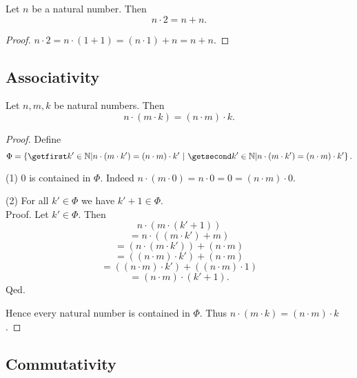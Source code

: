 \documentclass[../arithmetic.tex]{subfiles}
\begin{document}
  \begin{forthel}
    \begin{corollary}
      Let $n$ be a natural number.
      Then \[ n \cdot 2 = n + n. \]
    \end{corollary}
    \begin{proof}
      $n \cdot 2
        = n \cdot (1 + 1)
        = (n \cdot 1) + n
        = n + n$.
    \end{proof}
  \end{forthel}


  \subsection*{Associativity}

  \begin{forthel}
    \begin{proposition}
      Let $n, m, k$ be natural numbers.
      Then \[ n \cdot (m \cdot k) = (n \cdot m) \cdot k. \]
    \end{proposition}
    \begin{proof}
      Define \[ \Phi = \class{k' \in \Nat | n \cdot (m \cdot k') =
      (n \cdot m) \cdot k'}. \]

      (1) $0$ is contained in $\Phi$.
      Indeed $n \cdot (m \cdot 0)
        = n \cdot 0
        = 0
        = (n \cdot m) \cdot 0$.

      (2) For all $k' \in \Phi$ we have $k' + 1 \in \Phi$. \\
      Proof.
        Let $k' \in \Phi$.
        Then
        \[  n \cdot (m \cdot (k' + 1))                          \]
        \[    = n \cdot ((m \cdot k') + m)                      \]
        \[    = (n \cdot (m \cdot k')) + (n \cdot m)            \]
        \[    = ((n \cdot m) \cdot k') + (n \cdot m)            \]
        \[    = ((n \cdot m) \cdot k') + ((n \cdot m) \cdot 1)  \]
        \[    = (n \cdot m) \cdot (k' + 1).                     \]
      Qed.

      Hence every natural number is contained in $\Phi$.
      Thus $n \cdot (m \cdot k) = (n \cdot m) \cdot k$.
    \end{proof}
  \end{forthel}


  \subsection*{Commutativity}
\end{document}
